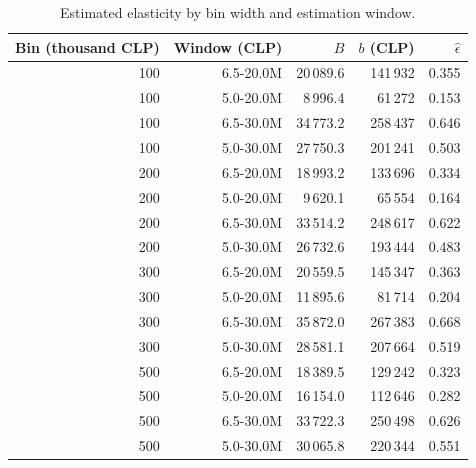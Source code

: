 \begin{table}[htbp]
\centering
\small
\begin{tabular}{rrrrr}
\toprule
Bin (thousand CLP) & Window (CLP) & $B$ & $b$ (CLP) & $\hat\epsilon$ \\
\midrule
100 & 6.5-20.0M & 20\,089.6 & 141\,932 & 0.355 \\
100 & 5.0-20.0M & 8\,996.4 & 61\,272 & 0.153 \\
100 & 6.5-30.0M & 34\,773.2 & 258\,437 & 0.646 \\
100 & 5.0-30.0M & 27\,750.3 & 201\,241 & 0.503 \\
200 & 6.5-20.0M & 18\,993.2 & 133\,696 & 0.334 \\
200 & 5.0-20.0M & 9\,620.1 & 65\,554 & 0.164 \\
200 & 6.5-30.0M & 33\,514.2 & 248\,617 & 0.622 \\
200 & 5.0-30.0M & 26\,732.6 & 193\,444 & 0.483 \\
300 & 6.5-20.0M & 20\,559.5 & 145\,347 & 0.363 \\
300 & 5.0-20.0M & 11\,895.6 & 81\,714 & 0.204 \\
300 & 6.5-30.0M & 35\,872.0 & 267\,383 & 0.668 \\
300 & 5.0-30.0M & 28\,581.1 & 207\,664 & 0.519 \\
500 & 6.5-20.0M & 18\,389.5 & 129\,242 & 0.323 \\
500 & 5.0-20.0M & 16\,154.0 & 112\,646 & 0.282 \\
500 & 6.5-30.0M & 33\,722.3 & 250\,498 & 0.626 \\
500 & 5.0-30.0M & 30\,065.8 & 220\,344 & 0.551 \\
\bottomrule
\end{tabular}
\caption{Estimated elasticity by bin width and estimation window.}
\label{tab:p1_iv}
\end{table}
